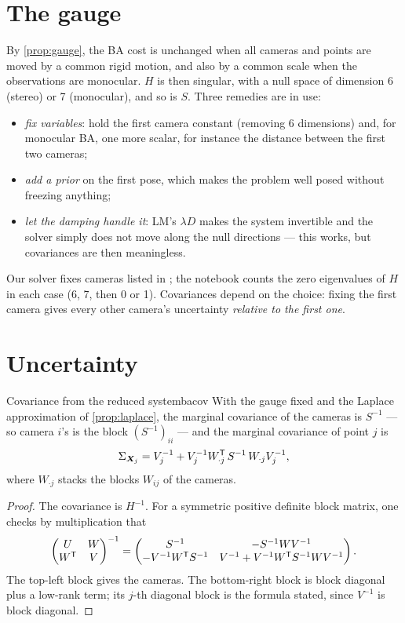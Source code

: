 \section{The gauge}

By \cref{prop:gauge}, the BA cost is unchanged when all cameras and
points are moved by a common rigid motion, and also by a common scale
when the observations are monocular. $H$ is then singular, with a null
space of dimension 6 (stereo) or 7 (monocular), and so is $S$. Three
remedies are in use:
\begin{itemize}[nosep]
\item \emph{fix variables}: hold the first camera constant (removing 6
  dimensions) and, for monocular BA, one more scalar, for instance the
  distance between the first two cameras;
\item \emph{add a prior} on the first pose, which makes the problem
  well posed without freezing anything;
\item \emph{let the damping handle it}: LM's $\lambda D$ makes the
  system invertible and the solver simply does not move along the null
  directions --- this works, but covariances are then meaningless.
\end{itemize}
Our solver fixes cameras listed in ; the notebook
counts the zero eigenvalues of $H$ in each case (6, 7, then 0 or 1).
Covariances depend on the choice: fixing the first camera gives every
other camera's uncertainty \emph{relative to the first one}.

\section{Uncertainty}

\begin{proposition}{Covariance from the reduced system}{bacov}
With the gauge fixed and the Laplace approximation of
\cref{prop:laplace}, the marginal covariance of the cameras is $S^{-1}$
--- so camera $i$'s is the block $(S^{-1})_{ii}$ --- and the marginal
covariance of point $j$ is
\[
\Sigma_{\bm{X}_j}=V_j^{-1}+V_j^{-1}W_{\cdot j}^{\mathsf{T}}\,S^{-1}\,W_{\cdot j}
V_j^{-1},
\]
where $W_{\cdot j}$ stacks the blocks $W_{ij}$ of the cameras.
\end{proposition}

\begin{proof}
The covariance is $H^{-1}$. For a symmetric positive definite block
matrix, one checks by multiplication that
\[
\begin{pmatrix}U&W\\W^{\mathsf{T}}&V\end{pmatrix}^{-1}=
\begin{pmatrix}S^{-1}&-S^{-1}WV^{-1}\\-V^{-1}W^{\mathsf{T}} S^{-1}&V^{-1}+V^{-1}W^{\mathsf{T}}
S^{-1}WV^{-1}\end{pmatrix}.
\]
The top-left block gives the cameras. The bottom-right block is block
diagonal plus a low-rank term; its $j$-th diagonal block is the formula
stated, since $V^{-1}$ is block diagonal.
\end{proof}

